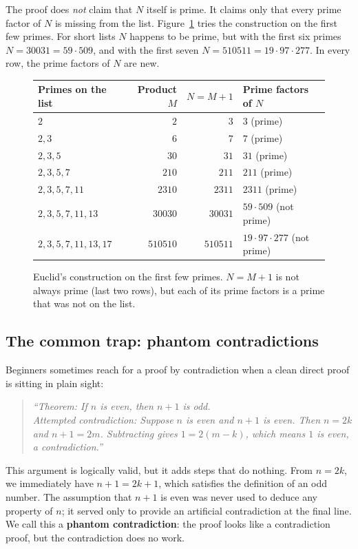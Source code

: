 The proof does \emph{not} claim that $N$ itself is prime. It claims only that every prime factor of $N$ is missing from the list. Figure~\ref{08:fig-euclid-numbers} tries the construction on the first few primes. For short lists $N$ happens to be prime, but with the first six primes $N = 30031 = 59 \cdot 509$, and with the first seven $N = 510511 = 19 \cdot 97 \cdot 277$. In every row, the prime factors of $N$ are new.

\begin{figure}[htbp]
\centering
\renewcommand{\arraystretch}{1.25}
\begin{tabular}{@{}l r r l@{}}
\toprule
Primes on the list & Product $M$ & $N = M + 1$ & Prime factors of $N$ \\
\midrule
$2$ & $2$ & $3$ & $3$ (prime) \\
$2, 3$ & $6$ & $7$ & $7$ (prime) \\
$2, 3, 5$ & $30$ & $31$ & $31$ (prime) \\
$2, 3, 5, 7$ & $210$ & $211$ & $211$ (prime) \\
$2, 3, 5, 7, 11$ & $2310$ & $2311$ & $2311$ (prime) \\
$2, 3, 5, 7, 11, 13$ & $30030$ & $30031$ & \textcolor{trapred!90!black}{$59 \cdot 509$ (not prime)} \\
$2, 3, 5, 7, 11, 13, 17$ & $510510$ & $510511$ & \textcolor{trapred!90!black}{$19 \cdot 97 \cdot 277$ (not prime)} \\
\bottomrule
\end{tabular}
\caption{Euclid's construction on the first few primes. $N = M + 1$ is not always prime (last two rows), but each of its prime factors is a prime that was not on the list.}
\label{08:fig-euclid-numbers}
\end{figure}

\subsection{The common trap: phantom contradictions}

Beginners sometimes reach for a proof by contradiction when a clean direct proof is sitting in plain sight:
\begin{quote}
\itshape ``Theorem: If $n$ is even, then $n+1$ is odd.\\
Attempted contradiction: Suppose $n$ is even and $n+1$ is even. Then $n = 2k$ and $n+1 = 2m$. Subtracting gives $1 = 2(m-k)$, which means $1$ is even, a contradiction.''
\end{quote}
This argument is logically valid, but it adds steps that do nothing. From $n = 2k$, we immediately have $n+1 = 2k+1$, which satisfies the definition of an odd number. The assumption that $n+1$ is even was never used to deduce any property of $n$; it served only to provide an artificial contradiction at the final line. We call this a \textbf{phantom contradiction}: the proof looks like a contradiction proof, but the contradiction does no work.

